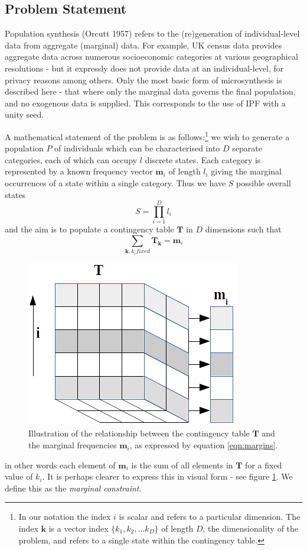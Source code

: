 \documentclass{JASSS}
\begin{document}
\subsection{Problem Statement}\label{problem-statement}

Population synthesis (Orcutt 1957) refers to the (re)generation of
individual-level data from aggregate (marginal) data. For example, UK
census data provides aggregate data across numerous socioeconomic
categories at various geographical resolutions - but it expressly does
not provide data at an individual-level, for privacy reasons among
others. Only the most basic form of microsynthesis is described here - that where only the marginal data governs the final population, and no exogenous data is supplied. This corresponds to the use of IPF with a unity seed.  

A mathematical statement of the problem is as
follows:\footnote{In our notation the index \(i\) is scalar and
  refers to a particular dimension. The index \(\mathbf{k}\) is a vector
  index \(\{k_1, k_2,...k_D\}\) of length \(D\), the dimensionality of
  the problem, and refers to a single state within the contingency table.}
we wish to generate a population \(P\) of individuals which can be characterised into \(D\) separate categories, 
each of which can occupy \(l\) discrete states. Each category is represented by a known frequency vector
\(\mathbf{m}_i\) of length \(l_i\) giving the marginal occurrences of a state within a single category. 
Thus we have \(S\) possible overall states 
\begin{equation}
S=\prod\limits_{i=1}^{D}l_i
\end{equation}
and the aim is to populate a contingency table \(\mathbf T\) in \(D\) dimensions such that
\begin{equation}
\sum\limits_{\mathbf{k}, k_i fixed} \mathbf{T}_\mathbf{k} = \mathbf{m}_i
\label{eqn:margins}
\end{equation}
\begin{figure}[!t]
\centering
\includegraphics[width=0.35\linewidth]{figures/equation7} 
\caption{Illustration of the relationship between the contingency table \(\mathbf{T}\) and the marginal frequencies \(\mathbf{m}_i\), as expressed by equation \ref{eqn:margins}.}
\label{fig:eq7}
\end{figure} 
in other words each element of \(\mathbf{m}_i\) is the sum of all
elements in \(\mathbf{T}\) for a fixed value of \(k_i\). It is perhaps clearer to express this in visual form - see figure \ref{fig:eq7}. We define this as the \emph{marginal constraint}.
\end{document}
